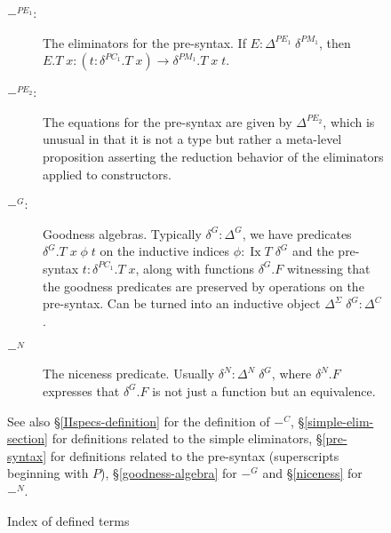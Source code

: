 \documentclass[acmsmall,review]{acmart}\settopmatter{printfolios=true,printccs=false,printacmref=false}
\DeclareMathOperator{\Ix}{Ix}
\begin{document}
\begin{figure}[htpb]
\begin{description}
        \item[$-^{PE_1}$:] The eliminators for the pre-syntax. If $E : \Delta^{PE_1}\;\delta^{PM_1}$, then $E.T\;x : (t : \delta^{PC_1}.T\;x) \to \delta^{PM_1}.T\;x\;t$.
        \item[$-^{PE_2}$:] The equations for the pre-syntax are given by $\Delta^{PE_2}$, which is unusual in that it is not a type but rather a meta-level proposition asserting the reduction behavior of the eliminators applied to constructors.
        \item[$-^G$:] Goodness algebras. Typically $\delta^G : \Delta^G$, we have predicates $\delta^G.T\;x\;\phi\;t$ on the inductive indices $\phi : \Ix T\;\delta^G$ and the pre-syntax $t : \delta^{PC_1}.T\;x$, along with functions $\delta^G.F$ witnessing that the goodness predicates are preserved by operations on the pre-syntax. Can be turned into an inductive object $\Delta^\Sigma\;\delta^G : \Delta^C$.
        \item[$-^N$] The niceness predicate. Usually $\delta^N : \Delta^N\;\delta^G$, where $\delta^N.F$ expresses that $\delta^G.F$ is not just a function but an equivalence.
    \end{description}

    See also \S\ref{IIspecs-definition} for the definition of $-^C$, \S\ref{simple-elim-section} for definitions related to the simple eliminators, \S\ref{pre-syntax} for definitions related to the pre-syntax (superscripts beginning with $P$), \S\ref{goodness-algebra} for $-^G$ and \S\ref{niceness} for $-^N$.
    
    \caption{\label{translation-index}Index of defined terms}
\end{figure}
\end{document}
